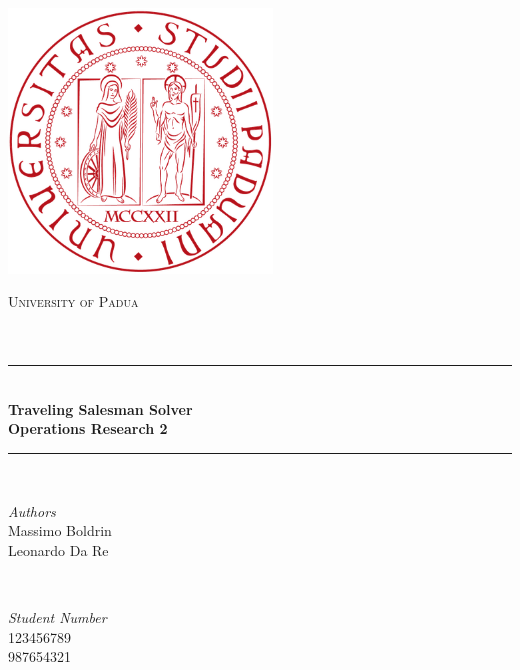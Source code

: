 \documentclass[a4paper]{report}
\begin{document}
\begin{titlepage} %
	\newcommand{\HRule}{\rule{\linewidth}{0.5mm}} %
	
	\center %
	
	\includegraphics[width=7cm]{unipd_logo.png}
	\bigskip
	
	\bigskip
	\textsc{\LARGE University of Padua}\\[1.5cm] %
	
	\textsc{\Large }\\[0.5cm] %
	
	\textsc{\large }\\[0.5cm] %
	
	
	\HRule\\[0.4cm]
	
	{\huge\bfseries Traveling Salesman Solver \\ Operations Research 2}\\[0.4cm] %
	
	\HRule\\[1.5cm]
	
	
	\begin{minipage}{0.4\textwidth}
		\begin{flushleft}
			\large
			\textit{Authors}\\
			Massimo Boldrin \\
            Leonardo Da Re
		\end{flushleft}
	\end{minipage}
	~
	\begin{minipage}{0.4\textwidth}
		\begin{flushright}
			\large
			\textit{Student Number}\\
			123456789 \\
            987654321
		\end{flushright}
	\end{minipage}
	

\end{titlepage}
\end{document}
